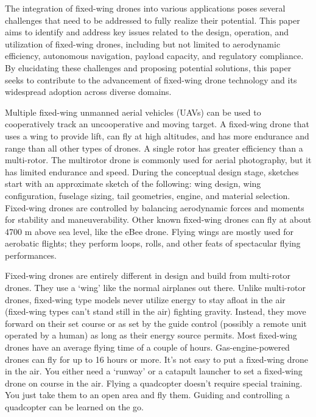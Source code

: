 \documentclass[conference]{IEEEtran}
\begin{document}
The integration of fixed-wing drones into various applications poses several challenges that need to be addressed to fully realize their potential. This paper aims to identify and address key issues related to the design, operation, and utilization of fixed-wing drones, including but not limited to aerodynamic efficiency, autonomous navigation, payload capacity, and regulatory compliance. By elucidating these challenges and proposing potential solutions, this paper seeks to contribute to the advancement of fixed-wing drone technology and its widespread adoption across diverse domains.

Multiple fixed-wing unmanned aerial vehicles (UAVs) can be used to cooperatively track an uncooperative and moving target. A fixed-wing drone that uses a wing to provide lift, can fly at high altitudes, and has more endurance and range than all other types of drones. A single rotor has greater efficiency than a multi-rotor. The multirotor drone is commonly used for aerial photography, but it has limited endurance and speed\cite{hayat2020multi}. During the conceptual design stage, sketches start with an approximate sketch of the following: wing design, wing configuration, fuselage sizing, tail geometries, engine, and material selection. Fixed-wing drones are controlled by balancing aerodynamic forces and moments for stability and maneuverability. Other known fixed-wing drones can fly at about 4700 m above sea level, like the eBee drone\cite{mwenegoha2019enhanced}. Flying wings are mostly used for aerobatic flights; they perform loops, rolls, and other feats of spectacular flying performances.

Fixed-wing drones are entirely different in design and build from multi-rotor drones. They use a ‘wing’ like the normal airplanes out there. Unlike multi-rotor drones, fixed-wing type models never utilize energy to stay afloat in the air (fixed-wing types can’t stand still in the air) fighting gravity. Instead, they move forward on their set course or as set by the guide control (possibly a remote unit operated by a human) as long as their energy source permits. Most fixed-wing drones have an average flying time of a couple of hours. Gas-engine-powered drones can fly for up to 16 hours or more. It’s not easy to put a fixed-wing drone in the air. You either need a ‘runway’ or a catapult launcher to set a fixed-wing drone on course in the air. Flying a quadcopter doesn’t require special training. You just take them to an open area and fly them. Guiding and controlling a quadcopter can be learned on the go\cite{laupre2023reliable}.
\end{document}

